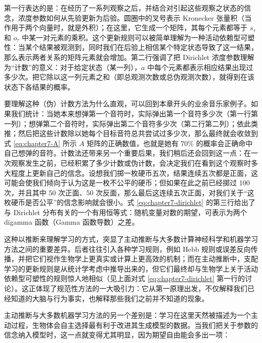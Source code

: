 第一行表达的是：在经历了一系列观察之后，并结合对引起这些观察之状态的信念，浓度参数如何从先验更新为后验。圆圈中的叉号表示 Kronecker 张量积（当作用于两个向量时，就是外积）；在这里，它生成一个矩阵，其每个元素都等于 $s_\tau$ 和 $o_\tau$ 中某一对元素的乘积。这个更新规则可以被简单理解为一种活动依赖型可塑性：当某个结果被观测到，同时我们在后验上相信某个特定状态导致了这一结果，那么表示两者关系的矩阵元素就会增加。第二行强调了把 Dirichlet 浓度参数理解为“计数”的意义：对于给定状态（某一列），$a$ 中每个元素都表示相应结果出现过多少次。把它除以这一列元素之和（即总观测次数或总伪观测次数），就得到在该状态下各结果的概率。

要理解这种（伪）计数方法为什么直观，可以回到本章开头的业余音乐家例子。如果我们统计：当她本来想弹第一个音符时，实际弹出第一个音符多少次（第一行第一列）；想弹第二个音符时，实际弹出第二个音符多少次（第二行第二列）；依此类推；然后把这些计数除以她每个目标音符总共尝试过多少次，那么最终就会收敛到式 \eqref{eq:chapter7-A} 所示 $A$ 矩阵的正确数值，也就是她有 $70\%$ 的概率会正确命中自己想弹的音符。计数法还带来另一个重要后果，我们稍后还会回到这一点：在一次观察发生之前，已经积累了多少计数或伪计数，会决定我们在看到这个观察时多大程度上更新自己的信念。设想我们掷一枚硬币五次，结果连续五次都是正面，这可能会使我们倾向于认为这是一枚不公平的硬币；但如果在此之前已经掷过 100 次，并且其中 50 次正面、50 次反面，那么最后这连续五次正面，对我们关于“这枚硬币是否公平”的信念影响就会很小。式 \eqref{eq:chapter7-dirichlet} 的第三行给出了与 Dirichlet 分布有关的一个有用恒等式：随机变量对数的期望，可表示为两个 digamma 函数（Gamma 函数导数）之差。

这种以推断来理解学习的方式，突显了主动推断与大多数计算神经科学和机器学习方法之间的重要差异。后者往往引入各种学习规则，例如 Hebb 规则或误差反向传播，并把它们视作生物学上更真实或计算上更高效的机制；而在主动推断中，支配学习的更新规则是从统计学考虑中推导出来的，但它们最终却与生物学上关于活动依赖型可塑性的规则惊人地相似（见上面对式 \eqref{eq:chapter7-dirichlet} 第一行的讨论）。这正体现了规范性方法的一大吸引力：它从第一原理出发，不仅解释我们已经知道的大脑与行为事实，也解释那些我们之前并不知道的现象。

主动推断与大多数机器学习方法的另一个差别是：学习在这里天然被描述为一个主动过程，生物体会自主选择最有利于改进其生成模型的数据。当我们把关于参数的信念纳入模型时，这一点就变得尤其明显，因为期望自由能会多出一项：

